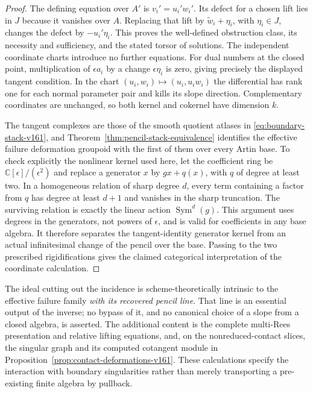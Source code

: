 \documentclass[11pt,reqno]{amsart}
\numberwithin{equation}{section}
\theoremstyle{definition}\newtheorem{definition}[theorem]{Definition}
\theoremstyle{remark}\newtheorem{remark}[theorem]{Remark}
\newcommand{\C}{\mathbb C}\newcommand{\Q}{\mathbb Q}
\DeclareMathOperator{\Sym}{Sym}\DeclareMathOperator{\Gr}{Gr}
\begin{document}
\begin{proof}
The defining equation over $A'$ is $v_i'=u_i'w_i'$.
Its defect for a chosen lift lies in $J$ because it vanishes over
$A$. Replacing that lift by $\widetilde w_i+\eta_i$, with
$\eta_i\in J$, changes the defect by $-u_i'\eta_i$.
This proves the well-defined obstruction class, its necessity and
sufficiency, and the stated torsor of solutions. The independent
coordinate charts introduce no further equations. For dual numbers
at the closed point, multiplication of $\epsilon a_i$ by a change
$\epsilon\eta_i$ is zero, giving precisely the displayed tangent
condition. In the chart $(u_i,w_i)\mapsto(u_i,u_iw_i)$ the
differential has rank one for each normal parameter pair and kills
its slope direction. Complementary coordinates are unchanged, so
both kernel and cokernel have dimension $k$.

The tangent complexes are those of the smooth quotient atlases in
\eqref{eq:boundary-stack-v161}, and
Theorem~\ref{thm:pencil-stack-equivalence} identifies the effective
failure deformation groupoid with the first of them over every
Artin base. To check explicitly the nonlinear kernel used here,
let the coefficient ring be $\C[\epsilon]/(\epsilon^2)$ and replace
a generator $x$ by $gx+q(x)$, with $q$ of degree at least two. In a
homogeneous relation of sharp degree $d$, every term containing a
factor from $q$ has degree at least $d+1$ and vanishes in the sharp
truncation. The surviving relation is exactly the linear action
$\Sym^d(g)$. This argument uses degrees in the generators, not
powers of $\epsilon$, and is valid for coefficients in any base
algebra. It therefore separates the tangent-identity generator
kernel from an actual infinitesimal change of the pencil over the
base. Passing to the two prescribed rigidifications gives the
claimed categorical interpretation of the coordinate calculation.
\end{proof}

The ideal cutting out the incidence is scheme-theoretically intrinsic
to the effective failure family \emph{with its recovered pencil line}.
That line is an essential output of the inverse; no bypass of it, and
no canonical choice of a slope from a closed algebra, is asserted.
The additional content is the complete multi-Rees presentation and
relative lifting equations, and, on the nonreduced-contact slices,
the singular graph and its computed cotangent module in
Proposition~\ref{prop:contact-deformations-v161}. These calculations
specify the interaction with boundary singularities rather than
merely transporting a pre-existing finite algebra by pullback.
\end{document}
